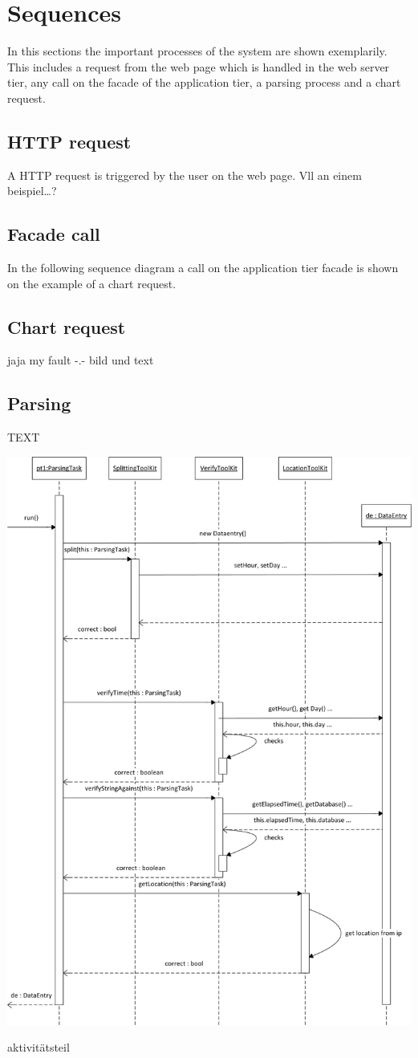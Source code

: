 \section{Sequences}
In this sections the important processes of the system are shown exemplarily. This includes a request 
from the web page which is handled in the web server tier, any call on the facade of the application tier,
a parsing process and a chart request.

\subsection{HTTP request}
A HTTP request is triggered by the user on the web page.
Vll an einem beispiel\ldots ?

\subsection{Facade call}
In the following sequence diagram a call on the application tier facade is shown on the example of a chart request.


\subsection{Chart request}
jaja my fault -.-
bild und text

\subsection{Parsing}
TEXT
\begin{center}
\includegraphics[width=0.7\linewidth]{Pictures/Seq/SeqParser.png}
\end{center}

aktivitätsteil

   
